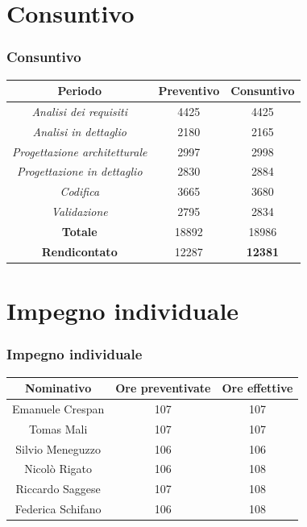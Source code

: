\section{Consuntivo}
\begin{frame}
	\frametitle{Consuntivo}
	
	\begin{center}
		\centering
		\begin{tabular}{|c|c|c|}
			\hline
			\textbf{Periodo} & \textbf{Preventivo} & \textbf{Consuntivo} \\
			\hline	\emph{Analisi dei requisiti}  &4425  &4425 \\
			\hline  \emph{Analisi in dettaglio}  &2180  &2165  \\
			\hline  \emph{Progettazione architetturale}  &2997  &2998  \\
			\hline  \emph{Progettazione in dettaglio}  &2830  &2884  \\
			\hline  \emph{Codifica}  &3665  &3680  \\
			\hline  \emph{Validazione}  &2795  &2834  \\
			\hline
			\textbf{Totale} &18892  & 18986  \\
			\hline
			\textbf{Rendicontato} &12287  & \textbf{12381} \\
			\hline
		\end{tabular}
		
	\end{center}
	
\end{frame}

\section{Impegno individuale}
\begin{frame}
	\frametitle{Impegno individuale}	
	\begin{center}
		\centering
		\begin{tabular}{|c|c|c|}
			\hline
			\textbf{Nominativo} & \textbf{Ore preventivate} & \textbf{Ore effettive} \\
			\hline Emanuele Crespan	  & 107  & 107 \\
			\hline Tomas Mali  & 107  & 107  \\
			\hline Silvio Meneguzzo  & 106  & 106  \\
			\hline Nicolò Rigato  & 106  & 108  \\
			\hline Riccardo Saggese   & 107  & 108  \\
			\hline Federica Schifano  & 106  & 108  \\
			\hline
		
			\end{tabular}
		
	\end{center}
	
\end{frame}

